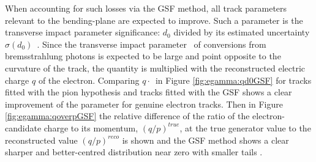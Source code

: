 When accounting for such losses via the GSF method, all track parameters relevant to the bending-plane are expected to improve.
Such a parameter is the transverse impact parameter significance: $d_{0}$ divided by its estimated uncertainty $\sigma(d_{0})$~\cite{Aaboud:2019ynx}.
Since the transverse impact parameter \trackdO\ of conversions from bremsstrahlung photons is expected to be large and point opposite to the curvature of the track, the quantity is multiplied with the reconstructed electric charge $q$ of the electron.
Comparing  $q\cdot$\dOSignificance\ in Figure \ref{fig:egamma:qd0GSF} for tracks fitted with the pion hypothesis and tracks fitted with the GSF shows a clear improvement of the parameter for genuine electron tracks.
Then in Figure \ref{fig:egamma:qoverpGSF} the relative difference of the ratio of the electron-candidate charge to its momentum, $(q/p)^{true}$, at the true generator value to the reconstructed value $(q/p)^{reco}$ is shown and the GSF method shows a clear sharper and better-centred distribution near zero with smaller tails \cite{Aaboud:2019ynx}.
